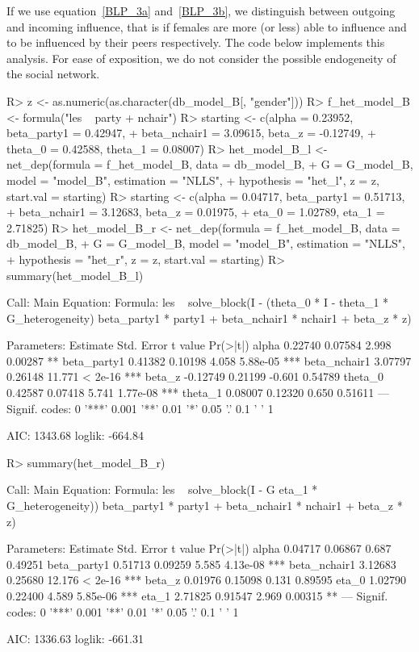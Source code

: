 \documentclass[nojss]{jss}
\begin{document}
If we use equation~\ref{BLP_3a} and~\ref{BLP_3b}, we distinguish between outgoing and incoming influence, that is if females are more (or less) able to influence and to be influenced by their peers respectively. The code below implements this analysis. For ease of exposition, we do not consider the possible endogeneity of the social network.
\begin{CodeChunk}
\begin{CodeInput}
R> z <- as.numeric(as.character(db_model_B[, "gender"]))
R> f_het_model_B <- formula("les ~ party + nchair")
R> starting <- c(alpha = 0.23952, beta_party1 = 0.42947,
+    beta_nchair1 = 3.09615, beta_z = -0.12749,
+    theta_0 = 0.42588, theta_1 = 0.08007)
R> het_model_B_l <- net_dep(formula = f_het_model_B, data = db_model_B,
+    G = G_model_B, model = "model_B", estimation = "NLLS",
+    hypothesis = "het_l", z = z, start.val = starting)
R> starting <- c(alpha = 0.04717, beta_party1 = 0.51713,
+    beta_nchair1 = 3.12683, beta_z = 0.01975,
+    eta_0 = 1.02789, eta_1 = 2.71825)
R> het_model_B_r <- net_dep(formula = f_het_model_B, data = db_model_B,
+    G = G_model_B, model = "model_B", estimation = "NLLS",
+    hypothesis = "het_r", z = z, start.val = starting)
R> summary(het_model_B_l)
\end{CodeInput}
\begin{CodeOutput}
Call:
Main Equation:  
Formula: les ~ solve_block(I - (theta_0 * I - 
theta_1 * G_heterogeneity) %
beta_party1 * party1 + beta_nchair1 * nchair1 + beta_z * z)

Parameters:
	      Estimate Std. Error t value Pr(>|t|)    
alpha         0.22740    0.07584   2.998  0.00287 ** 
beta_party1   0.41382    0.10198   4.058 5.88e-05 ***
beta_nchair1  3.07797    0.26148  11.771  < 2e-16 ***
beta_z       -0.12749    0.21199  -0.601  0.54789    
theta_0       0.42587    0.07418   5.741 1.77e-08 ***
theta_1       0.08007    0.12320   0.650  0.51611    
---
Signif. codes:  0 '***' 0.001 '**' 0.01 '*' 0.05 '.' 0.1 ' ' 1

AIC: 1343.68  loglik: -664.84
\end{CodeOutput}
\begin{CodeInput}
R> summary(het_model_B_r)
\end{CodeInput}
\begin{CodeOutput}
Call:
Main Equation:  
Formula: les ~ solve_block(I - G %
eta_1 * G_heterogeneity)) %
beta_party1 * party1 + beta_nchair1 * nchair1 + beta_z * z)

Parameters:
	      Estimate Std. Error t value Pr(>|t|)    
alpha         0.04717    0.06867   0.687  0.49251    
beta_party1   0.51713    0.09259   5.585 4.13e-08 ***
beta_nchair1  3.12683    0.25680  12.176  < 2e-16 ***
beta_z        0.01976    0.15098   0.131  0.89595    
eta_0         1.02790    0.22400   4.589 5.85e-06 ***
eta_1         2.71825    0.91547   2.969  0.00315 ** 
---
Signif. codes:  0 '***' 0.001 '**' 0.01 '*' 0.05 '.' 0.1 ' ' 1

AIC: 1336.63  loglik: -661.31
\end{CodeOutput}
\end{CodeChunk}
\end{document}
